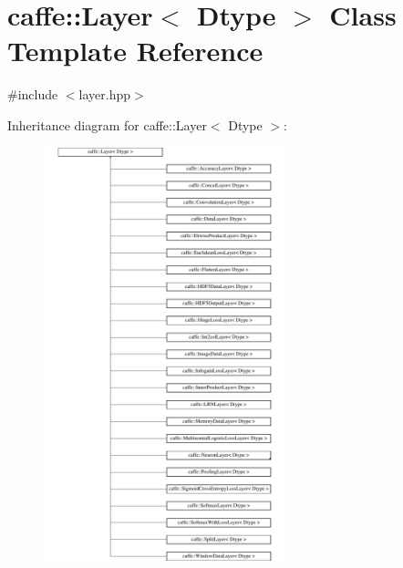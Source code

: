 \hypertarget{classcaffe_1_1_layer}{\section{caffe\+:\+:Layer$<$ Dtype $>$ Class Template Reference}
\label{classcaffe_1_1_layer}
}


{\ttfamily \#include $<$layer.\+hpp$>$}

Inheritance diagram for caffe\+:\+:Layer$<$ Dtype $>$\+:\begin{figure}[H]
\begin{center}
\leavevmode
\includegraphics[height=12.000000cm]{classcaffe_1_1_layer}
\end{center}
\end{figure}
